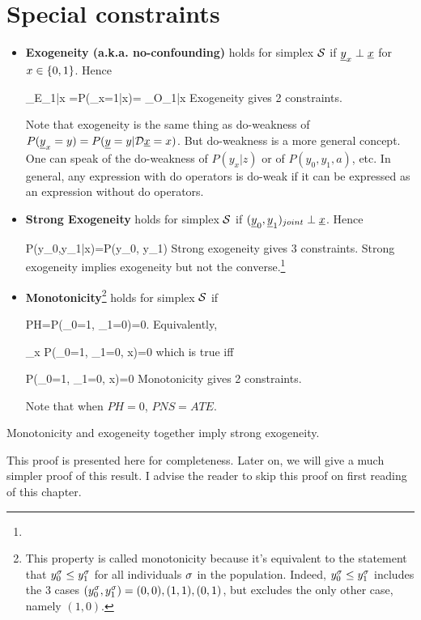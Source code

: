 \section{Special constraints}
\begin{itemize}
\item
{\bf Exogeneity (a.k.a. no-confounding)}
holds for simplex ${\cal S}$
if
$\rvy_x\perp \rvx$ for $x\in\{0,1\}$.
 Hence

\beq
{}_{E_{1|x}}
=P(\rvy_x=1|x)=
_{O_{1|x}}
\quad {}
\eeq
Exogeneity gives {\color{red}2 constraints}.

Note that exogeneity
is the same thing as do-weakness
of $P(\rvy_x=y)=P(\rvy=y|\cald\rvx=x)$.
But do-weakness is a more
general concept. One can speak
of the do-weakness of $P(y_x|z)$
or of $P(y_0, y_1, a)$, etc.
In general,
any expression with
do operators is do-weak
if it can be expressed
as an expression without
do operators.

\item
{\bf Strong Exogeneity} holds
for simplex ${\cal S}$
if $(\rvy_0, \rvy_1)_{joint}
\perp \rvx$. Hence

\beq
P(y_0,y_1|x)=P(y_0, y_1)
\label{eq-strong-exogen}
\eeq
Strong exogeneity gives {\color{red} 3 constraints}.
Strong exogeneity implies
exogeneity
but not the converse.\footnote{
}
\item
{\bf Monotonicity}\footnote{
This property is called monotonicity
 because
it's equivalent to the statement
that $y_0^\sigma\leq y_1^\sigma$ for
all individuals $\sigma$
in the population.
Indeed, $y_0^\sigma\leq y_1^\sigma$
includes the 3 cases $(y_0^\sigma, y_1^\sigma)=
(0,0), (1, 1), (0,1)$, but
excludes the only other
case, namely $(1,0)$.}
 holds for simplex ${\cal S}$ if

\beq PH=P(\rvy_0=1,
 \rvy_1=0)=0\eeq\;.
Equivalently,

\beq
\sum_x P(\rvy_0=1, \rvy_1=0, x)=0
\eeq
which is true iff

\beq
 P(\rvy_0=1, \rvy_1=0, x)=0\quad
{}
\eeq
Monotonicity gives {\color{red} 2
constraints}.

Note that when $PH=0$, $PNS=ATE$.
\end{itemize}



\begin{claim}
Monotonicity and exogeneity
together imply strong exogeneity.
\end{claim}
\proof

This proof is presented here
for completeness. Later
on, we will give a much
simpler proof of this result.
I advise the reader to skip this proof
on first reading
of this chapter.

